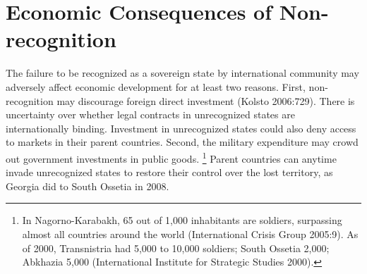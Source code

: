 \documentclass[12pt,a4paper]{article}%
\begin{document}
 
 

\section{Economic Consequences of Non-recognition}\label{theory}
The failure to be recognized as a sovereign state by international community may adversely affect economic development for at least two reasons.
First, non-recognition may discourage foreign direct investment (Kolsto 2006:729). 
There is uncertainty over whether legal contracts in unrecognized states are internationally binding. 
Investment in unrecognized states could also deny access to markets in their parent countries.
Second, the military expenditure may crowd out government investments in public goods.%
\footnote{
	In Nagorno-Karabakh, 65 out of 1,000 inhabitants are soldiers, surpassing almost all countries around the world (International Crisis Group 2005:9). 
	As of 2000, Transnistria had 5,000 to 10,000 soldiers; South Ossetia 2,000; Abkhazia 5,000 (International Institute for Strategic Studies 2000).
}
Parent countries can anytime invade unrecognized states to restore their control over the lost territory, as Georgia did to South Ossetia in 2008.
\end{document}
